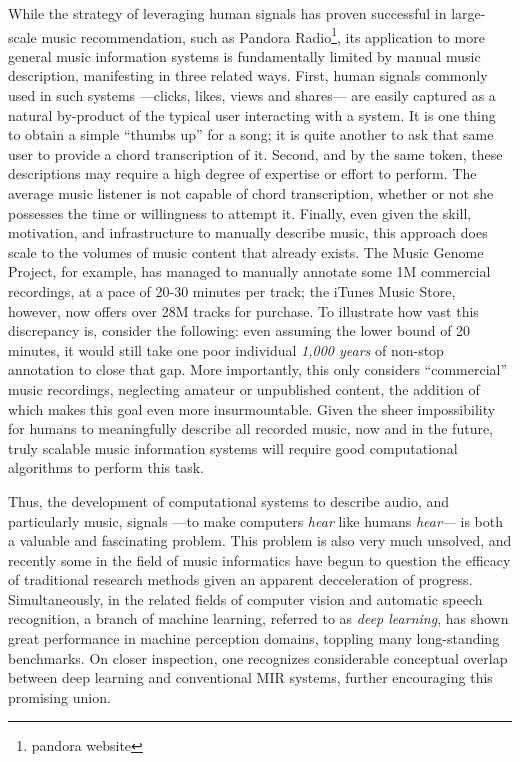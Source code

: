 While the strategy of leveraging human signals has proven successful in large-scale music recommendation, such as Pandora Radio\footnote{pandora website}, its application to more general music information systems is fundamentally limited by manual music description, manifesting in three related ways.
First, human signals commonly used in such systems ---clicks, likes, views and shares--- are easily captured as a natural by-product of the typical user interacting with a system.
It is one thing to obtain a simple ``thumbs up'' for a song; it is quite another to ask that same user to provide a chord transcription of it.
Second, and by the same token, these descriptions may require a high degree of expertise or effort to perform.
The average music listener is not capable of chord transcription, whether or not she possesses the time or willingness to attempt it.
Finally, even given the skill, motivation, and infrastructure to manually describe music, this approach does scale to the volumes of music content that already exists.
The Music Genome Project, for example, has managed to manually annotate some 1M commercial recordings, at a pace of 20-30 minutes per track; the iTunes Music Store, however, now offers over 28M tracks for purchase.
To illustrate how vast this discrepancy is, consider the following: even assuming the lower bound of 20 minutes, it would still take one poor individual \emph{1,000 years} of non-stop annotation to close that gap.
More importantly, this only considers ``commercial'' music recordings, neglecting amateur or unpublished content, the addition of which makes this goal even more insurmountable.
Given the sheer impossibility for humans to meaningfully describe all recorded music, now and in the future, truly scalable music information systems will require good computational algorithms to perform this task.

Thus, the development of computational systems to describe audio, and particularly music, signals ---to make computers \emph{hear} like humans \emph{hear}--- is both a valuable and fascinating problem.
This problem is also very much unsolved, and recently some in the field of music informatics have begun to question the efficacy of traditional research methods given an apparent decceleration of progress.
Simultaneously, in the related fields of computer vision and automatic speech recognition, a branch of machine learning, referred to as \emph{deep learning}, has shown great performance in machine perception domains, toppling many long-standing benchmarks.
On closer inspection, one recognizes considerable conceptual overlap between deep learning and conventional MIR systems, further encouraging this promising union.

